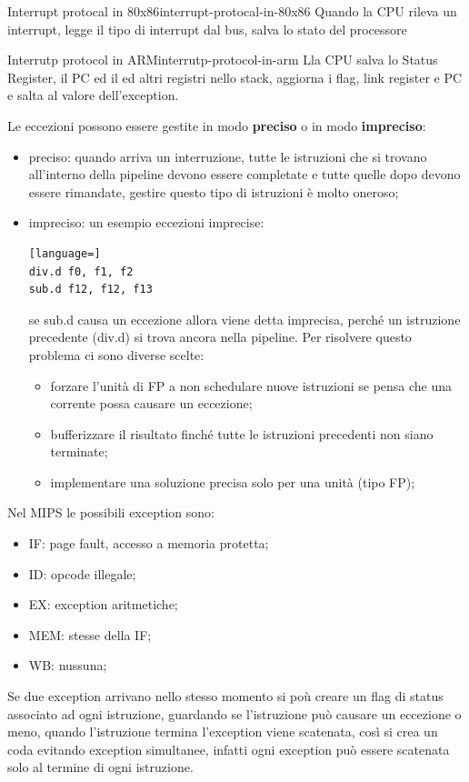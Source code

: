\documentclass[12pt]{article}
\begin{document}
\begin{example}{Interrupt protocal in 80x86}{interrupt-protocal-in-80x86}
    Quando la CPU rileva un interrupt, legge il tipo di interrupt dal bus, salva lo stato del processore
\end{example}

\begin{example}{Interrutp protocol in ARM}{interrutp-protocol-in-arm}
    Lla CPU salva lo Status Register, il PC ed il ed altri registri nello stack, aggiorna i flag, link register e PC  e salta al valore dell'exception.
\end{example}
Le eccezioni possono essere gestite in modo \textbf{preciso} o in modo \textbf{impreciso}:
\begin{itemize}
    \item preciso: quando arriva un interruzione, tutte le istruzioni che si trovano all'interno della pipeline devono essere completate e tutte quelle dopo devono essere rimandate, gestire questo tipo di istruzioni \`e molto oneroso;
    \item impreciso: un esempio eccezioni imprecise:
\begin{lstlisting}[language=]
div.d f0, f1, f2
sub.d f12, f12, f13
\end{lstlisting}
    se sub.d causa un eccezione allora viene detta imprecisa, perch\'e un istruzione precedente (div.d) si trova ancora nella pipeline. Per risolvere questo problema ci sono diverse scelte:
    \begin{itemize}
        \item forzare l'unit\`a di FP a non schedulare nuove istruzioni se pensa che una corrente possa causare un eccezione;
        \item bufferizzare il risultato finch\'e tutte le istruzioni precedenti non siano terminate;
        \item implementare una soluzione precisa solo per una unit\`a (tipo FP);
    \end{itemize}
\end{itemize}
Nel MIPS le possibili exception sono:
\begin{itemize}
    \item IF: page fault, accesso a memoria protetta;
    \item ID: opcode illegale;
    \item EX: exception aritmetiche;
    \item MEM: stesse della IF;
    \item WB: nussuna;
\end{itemize}
Se due exception arrivano nello stesso momento si po\`u creare un flag di status associato ad ogni istruzione, guardando se l'istruzione pu\`o causare un eccezione o meno, quando l'istruzione termina l'exception viene scatenata, cos\`i si crea un coda evitando exception simultanee, infatti ogni exception pu\`o essere scatenata solo al termine di ogni istruzione.
\end{document}
